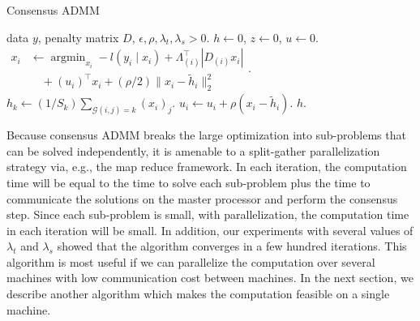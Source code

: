 \documentclass[letterpaper]{article} %
\DeclareMathOperator*{\argmin}{argmin}
\newcommand{\attn}[1]{\textcolor{red}{TODO: #1}}
\newcommand{\given}{\;\vert\;}
\newcommand{\norm}[1]{\left\lVert #1 \right\rVert}
\begin{document}
\begin{algorithm}[tb]
  \caption{Consensus ADMM }
  \label{alg:conADMM}
  \begin{algorithmic}[1]
     data $y$, penalty matrix $D$, 
    $\epsilon, \rho,\lambda_t,\lambda_s >0$.
     $h\leftarrow 0$, $z\leftarrow 0$, $u\leftarrow
    0$.  
    \REPEAT
    \STATE $\begin{aligned}x_i&\leftarrow\argmin_{x_i} -l(y_i\given
    x_i)+\Lambda_{(i)}^\top |D_{(i)}x_i|\\&\quad+ (u_i)^\top x_i +
    (\rho/2)  \lVert x_i-\tilde{h}_i \rVert_2^2\end{aligned}$. \\
    \STATE $h_k\leftarrow (1/S_k)\sum_{\mathscr{G}(i,j)=k} (x_i)_j
    $. 
    \STATE $ u_i\leftarrow u_i + \rho (x_i-\tilde{h}_i)$. 
    \UNTIL {$\max\left\{\norm{h^{m+1}-h^m},\ \norm{h^m-x^m}\right\} < \epsilon$}
     $h$.
  \end{algorithmic}
\end{algorithm}



Because consensus ADMM breaks the large optimization into
sub-problems that can be solved independently, it is amenable to a
split-gather parallelization strategy via, e.g., the map reduce framework.
In each iteration, the
computation time will be equal to the time to solve each sub-problem
plus the time to communicate the solutions on the master processor
and perform the consensus step. Since each sub-problem is
small, with parallelization, the computation time in each iteration
will be small. In addition, our experiments with several values of
$\lambda_t$ and $\lambda_s$ showed that the algorithm converges in a few
hundred iterations. 
This algorithm is most useful if we can parallelize the
computation over several machines with low communication cost between
machines. In the next section, we describe 
another algorithm which makes the computation feasible on a single
machine. 
\end{document}
